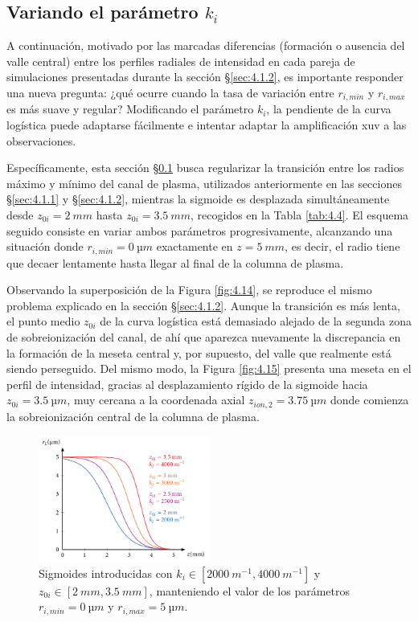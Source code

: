 \subsection{Variando el parámetro $k_{i}$}\label{sec:4.1.3}
A continuación, motivado por las marcadas diferencias (formación o ausencia del valle central) entre los perfiles radiales de intensidad en cada pareja de simulaciones presentadas durante la sección \S\ref{sec:4.1.2}, es importante responder una nueva pregunta: ¿qué ocurre cuando la tasa de variación entre $r_{i,min}$ y $r_{i,max}$ es más suave y regular? Modificando el parámetro $k_{i}$, la pendiente de la curva logística puede adaptarse fácilmente e intentar adaptar la amplificación \acrshort{xuv} a las observaciones.

Específicamente, esta sección \S\ref{sec:4.1.3} busca regularizar la transición entre los radios máximo y mínimo del canal de plasma, utilizados anteriormente en las secciones \S\ref{sec:4.1.1} y \S\ref{sec:4.1.2}, mientras la sigmoide es desplazada simultáneamente desde $z_{0i}=\qty{2}{mm}$ hasta $z_{0i}=\qty{3.5}{mm}$, recogidos en la Tabla \ref{tab:4.4}. El esquema seguido consiste en variar ambos parámetros progresivamente, alcanzando una situación donde $r_{i,min}=\qty{0}{µm}$ exactamente en $z=\qty{5}{mm}$, es decir, el radio tiene que decaer lentamente hasta llegar al final de la columna de plasma.

Observando la superposición de la Figura \ref{fig:4.14}, se reproduce el mismo problema explicado en la sección \S\ref{sec:4.1.2}. Aunque la transición es más lenta, el punto medio $z_{0i}$ de la curva logística está demasiado alejado de la segunda zona de sobreionización del canal, de ahí que aparezca nuevamente la discrepancia en la formación de la meseta central y, por supuesto, del valle que realmente está siendo perseguido. Del mismo modo, la Figura \ref{fig:4.15} presenta una meseta en el perfil de intensidad, gracias al desplazamiento rígido de la sigmoide hacia $z_{0i}=\qty{3.5}{µm}$, muy cercana a la coordenada axial $z_{ion,2}=\qty{3.75}{µm}$ donde comienza la sobreionización central de la columna de plasma.

\begin{figure}[htbp]
  \centering
  \includegraphics[width=0.5\textwidth]{Figuras/ch4_sigm_k.pdf}
  \caption{Sigmoides introducidas con $k_{i}\in[\qty{2000}{m^{-1}},\qty{4000}{m^{-1}}]$ y $z_{0i}\in[\qty{2}{mm},\qty{3.5}{mm}]$, manteniendo el valor de los parámetros $r_{i,min}=\qty{0}{µm}$ y $r_{i,max}=\qty{5}{µm}$.}
  \label{fig:4.13}
\end{figure}

